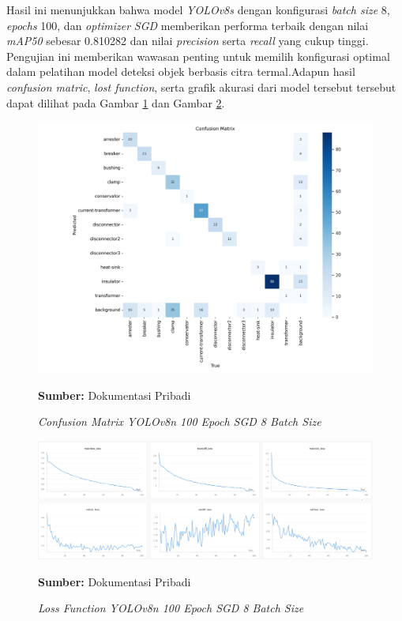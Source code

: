 Hasil ini menunjukkan bahwa model \emph{YOLOv8s} dengan konfigurasi \emph{batch size} 8, \emph{epochs} 100, dan \emph{optimizer} \emph{SGD} memberikan performa terbaik dengan nilai \emph{mAP50} sebesar 0.810282 dan nilai \emph{precision} serta \emph{recall} yang cukup tinggi. Pengujian ini memberikan wawasan penting untuk memilih konfigurasi optimal dalam pelatihan model deteksi objek berbasis citra termal.Adapun hasil \emph{confusion matric}, \emph{lost function}, serta grafik akurasi dari model tersebut tersebut dapat dilihat pada Gambar \ref{fig:confusion_matrix} dan Gambar \ref{fig:loss_function}.
\begin{figure}[H] 
    \centering
    \includegraphics[scale=0.15]{gambar/bab4/cf_res.png}
    \caption{\emph{Confusion Matrix YOLOv8n 100 Epoch SGD 8 Batch Size}}
    \footnotesize{\textbf{Sumber:} Dokumentasi Pribadi}
    \label{fig:confusion_matrix}
\end{figure}

\begin{figure}[H] 
    \centering
    \includegraphics[scale=0.3]{gambar/bab4/lost_function.png}
    \caption{\emph{Loss Function YOLOv8n 100 Epoch SGD 8 Batch Size}}
    \label{fig:loss_function}
    \footnotesize{\textbf{Sumber:} Dokumentasi Pribadi}
\end{figure}


